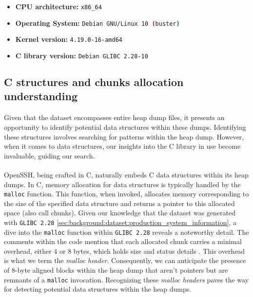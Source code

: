         \begin{itemize}
            \item \textbf{CPU architecture:} \lstinline[language=bash]|x86_64|
            \item \textbf{Operating System:} \lstinline[language=bash]|Debian GNU/Linux 10 (buster)|
            \item \textbf{Kernel version:} \lstinline[language=bash]|4.19.0-16-amd64|
            \item \textbf{C library version:} \lstinline[language=bash]|Debian GLIBC 2.28-10|
        \end{itemize}

    \subsection{C structures and chunks allocation understanding}

        \paragraph{}Given that the dataset encompasses entire heap dump files, it presents an opportunity to identify potential data structures within these dumps. Identifying these structures involves searching for patterns within the heap dump. However, when it comes to data structures, our insights into the C library in use become invaluable, guiding our search.

        \paragraph{}OpenSSH, being crafted in C, naturally embeds C data structures within its heap dumps. In C, memory allocation for data structures is typically handled by the \lstinline[language=c]|malloc| function. This function, when invoked, allocates memory corresponding to the size of the specified data structure and returns a pointer to this allocated space (also call \glspl{chunk}). Given our knowledge that the dataset was generated with \texttt{GLIBC 2.28} \ref{sec:background:dataset:production_system_information}, a dive into the \lstinline[language=c]|malloc| function within \texttt{GLIBC 2.28} reveals a noteworthy detail. The comments within the code mention that each allocated \gls{chunk} carries a minimal overhead, either 4 or 8 bytes, which holds size and status details \cite{gloger_malloc_2001}. This overhead is what we term the \textit{malloc header}. Consequently, we can anticipate the presence of 8-byte aligned blocks within the heap dump that aren't pointers but are remnants of a \lstinline[language=c]|malloc| invocation. Recognizing these \textit{malloc headers} paves the way for detecting potential data structures within the heap dumps.

